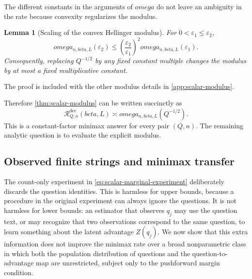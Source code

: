 \documentclass[11pt]{article}
\def\beta{beta}%
\def\omega{omega}%
\newtheorem{lemma}[theorem]{Lemma}
\newcommand{\calR}{\mathcal R}
\newcommand{\eps}{\varepsilon}
\begin{document}
The different constants in the arguments of $\omega$ do not leave an ambiguity in the rate because convexity regularizes the modulus.

\begin{lemma}[Scaling of the convex Hellinger modulus]
\label{lem:modulus-scaling}
For $0<\eps_1\le\eps_2$,
\begin{equation}
\label{eq:modulus-scaling}
\omega_{n,\beta,L}(\eps_2)
\le
\left(\frac{\eps_2}{\eps_1}\right)^2
\omega_{n,\beta,L}(\eps_1).
\end{equation}
Consequently, replacing $Q^{-1/2}$ by any fixed constant multiple changes the modulus by at most a fixed multiplicative constant.
\end{lemma}
The proof is included with the other modulus details in \cref{app:scalar-modulus}.

Therefore \cref{thm:scalar-modulus} can be written succinctly as
\begin{equation}
\label{eq:scalar-modulus-succinct}
\boxed{
\calR^{\mathrm{dec}}_{Q,n}(\beta,L)
\asymp
\omega_{n,\beta,L}(Q^{-1/2}).
}
\end{equation}
This is a constant-factor minimax answer for every pair $(Q,n)$.  The remaining analytic question is to evaluate the explicit modulus.

\subsection{Observed finite strings and minimax transfer}
\label{sec:observed-transfer}

The count-only experiment in \eqref{eq:scalar-marginal-experiment} deliberately discards the question identities.  This is harmless for upper bounds, because a procedure in the original experiment can always ignore the questions.  It is not harmless for lower bounds: an estimator that observes $q_j$ may use the question text, or may recognize that two observations correspond to the same question, to learn something about the latent advantage $Z(q_j)$.  We now show that this extra information does not improve the minimax rate over a broad nonparametric class in which both the population distribution of questions and the question-to-advantage map are unrestricted, subject only to the pushforward margin condition.
\end{document}
